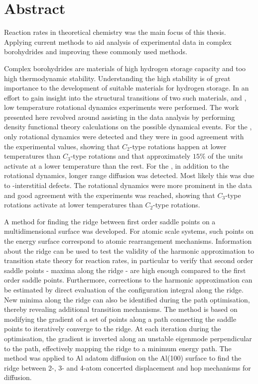 \chapter*{Abstract}

Reaction rates in theoretical chemistry was the main focus of this thesis.
Applying current methods to aid analysis of experimental data in complex borohydrides and improving these commonly used methods.

Complex borohydrides are materials of high hydrogen storage capacity and too high thermodynamic stability.
Understanding the high stability is of great importance to the development of suitable materials for hydrogen storage.
In an effort to gain insight into the structural transitions of two such materials,  and , low temperature rotational dynamics experiments were performed.
The work presented here revolved around assisting in the data analysis by performing density functional theory calculations on the possible dynamical events.
For the , only rotational dynamics were detected and they were in good agreement with the experimental values, showing that $C_2$-type rotations happen at lower temperatures than $C_3$-type rotations and that approximately $15\%$ of the  units activate at a lower temperature than the rest.
For the , in addition to the rotational dynamics, longer range diffusion was detected.
Most likely this was due to -interstitial defects.
The rotational dynamics were more prominent in the data and good agreement with the experiments was reached, showing that $C_3$-type rotations activate at lower temperatures than $C_2$-type rotations.

A method for finding the ridge between first order saddle points on a multidimensional surface was developed.
For atomic scale systems, such points on the energy surface correspond to atomic rearrangement mechanisms.
Information about the ridge can be used to test the validity of the harmonic approximation to transition state theory for reaction rates,
in particular to verify that second order saddle points - maxima along the ridge - are high enough compared to the first order saddle points.
Furthermore, corrections to the harmonic approximation can be estimated by direct evaluation of the configuration integral along the ridge.
New minima along the ridge can also be identified during the path optimisation,
thereby revealing additional transition mechanisms.
The method is based on modifying the gradient of a set of points along a path connecting the saddle points to iteratively converge to the ridge.
At each iteration during the optimisation, the gradient is inverted along an unstable eigenmode perpendicular to the path, effectively mapping the ridge to a minimum energy path.
The method was applied to Al adatom diffusion on the Al(100) surface to find the ridge between 2-, 3- and 4-atom concerted displacement
and hop mechanisms for diffusion.
